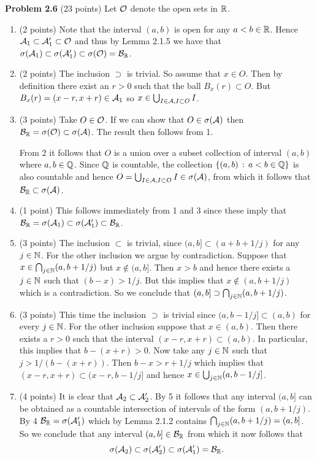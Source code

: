 
\textbf{Problem 2.6} (23 points)
Let $\mathcal O$ denote the open sets in $\mathbb R$.
\begin{enumerate}[label=(\alph*)]
\item (2 points) Note that the interval $(a,b)$ is open for any $a < b \in \mathbb R$. Hence $\mathcal A_1 \subset \mathcal A_1^\prime \subset \mathcal O$ and thus by Lemma 2.1.5 we have that $\sigma(\mathcal A_1) \subset \sigma(\mathcal A_1^\prime) \subset \sigma(\mathcal O) = \mathcal B_{\mathbb R}$.
\item (2 points) The inclusion $\supset$ is trivial. So assume that $x \in O$. Then by definition there exist an $r > 0$ such that the ball $B_x(r) \subset O$. But $B_x(r) = (x-r, x+r) \in \mathcal A_1$ so $x \in \bigcup_{I \in \mathcal A, I \subset O} I$.
\item (3 points) Take $O \in \mathcal O$. If we can show that $O \in \sigma(\mathcal A)$ then $\mathcal B_{\mathbb R} = \sigma(\mathcal O) \subset \sigma(\mathcal A)$. The result then follows from 1. 

From 2 it follows that $O$ is a union over a subset collection of interval $(a,b)$ where $a,b \in \mathbb Q$. Since $\mathbb Q$ is countable, the collection $\{(a,b) \, : \, a < b \in \mathbb Q\}$ is also countable and hence $O = \bigcup_{I \in \mathcal A, I \subset O} I \in \sigma(\mathcal A)$, from which it follows that $\mathcal B_{\mathbb R} \subset \sigma(\mathcal A)$.
\item (1 point) This follows immediately from 1 and 3 since these imply that $\mathcal B_{\mathbb R} = \sigma(\mathcal A_1) \subset \sigma(\mathcal A_1^\prime) \subset \mathcal B_{\mathbb R}$.
\item (3 points) The inclusion $\subset$ is trivial, since $(a,b] \subset (a + b +1/j)$ for any $j \in \mathbb N$. For the other inclusion we argue by contradiction. Suppose that $x \in \bigcap_{j \in \mathbb N} (a,b+1/j)$ but $x \notin (a,b]$. Then $x > b$ and hence there exists a $j \in \mathbb N$ such that $(b-x) > 1/j$. But this implies that $x \notin (a,b+1/j)$ which is a contradiction. So we conclude that $(a,b] \supset \bigcap_{j \in \mathbb N} (a,b+1/j)$.
\item (3 points) This time the inclusion $\supset$ is trivial since $(a,b-1/j] \subset (a,b)$ for every $j \in \mathbb N$. For the other inclusion suppose that $x \in (a,b)$. Then there exists a $r > 0$ such that the interval $(x-r,x+r) \subset (a,b)$. In particular, this implies that $b - (x+r) > 0$. Now take any $j \in \mathbb N$ such that $j >1/(b - (x+r))$. Then $b - x > r + 1/j$ which implies that $(x-r,x+r) \subset (x-r,b-1/j]$ and hence $x \in \bigcup_{j \in \mathbb N} (a,b-1/j]$.
\item (4 points) It is clear that $\mathcal A_2 \subset \mathcal A_2^\prime$. By 5 it follows that any interval $(a,b]$ can be obtained as a countable intersection of intervals of the form $(a,b+1/j)$. By 4 $\mathcal B_{\mathbb R} = \sigma(\mathcal A_1^\prime)$ which by Lemma 2.1.2 contains $\bigcap_{j \in \mathbb N} (a,b+1/j) = (a,b]$. So we conclude that any interval $(a,b] \in \mathcal B_{\mathbb R}$ from which it now follows that
\[
	\sigma(\mathcal A_2) \subset \sigma(\mathcal A_2^\prime) \subset \sigma(\mathcal A_1^\prime) = \mathcal B_{\mathbb R}.
\]


\end{enumerate}
